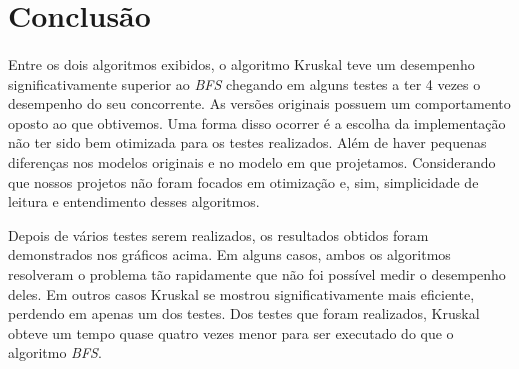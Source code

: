 \documentclass[12pt]{article}
\begin{document}
  \section{Conclusão}

  \paragraph{} Entre os dois algoritmos exibidos, o algoritmo Kruskal teve um desempenho significativamente superior ao \emph{BFS} chegando em alguns testes a ter 4 vezes o desempenho do seu concorrente. As versões originais possuem um comportamento oposto ao que obtivemos. Uma forma disso ocorrer é a escolha da implementação não ter sido bem otimizada para os testes realizados. Além de haver pequenas diferenças nos modelos originais e no modelo em que projetamos. Considerando que nossos projetos não foram focados em otimização e, sim, simplicidade de leitura e entendimento desses algoritmos. 

Depois de vários testes serem realizados, os resultados obtidos foram demonstrados nos gráficos acima. Em alguns casos, ambos os algoritmos resolveram o problema tão rapidamente que não foi possível medir o desempenho deles. Em outros casos Kruskal se mostrou significativamente mais eficiente, perdendo em apenas um dos testes. Dos testes que foram realizados, Kruskal obteve um tempo quase quatro vezes menor para ser executado do que o algoritmo \emph{BFS}.
\end{document}
